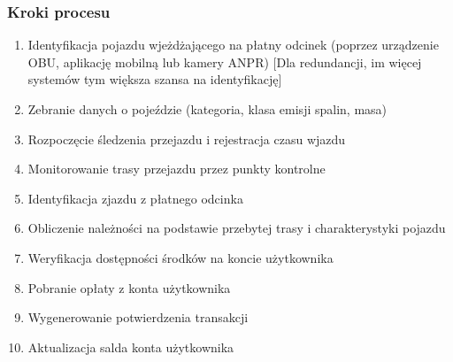 \documentclass[12pt]{article}
\begin{document}
\subsubsection{Kroki procesu}
\begin{enumerate}
    \item Identyfikacja pojazdu wjeżdżającego na płatny odcinek (poprzez urządzenie OBU, aplikację mobilną lub kamery ANPR) [Dla redundancji, im więcej systemów tym większa szansa na identyfikację]
    \item Zebranie danych o pojeździe (kategoria, klasa emisji spalin, masa)
    \item Rozpoczęcie śledzenia przejazdu i rejestracja czasu wjazdu
    \item Monitorowanie trasy przejazdu przez punkty kontrolne
    \item Identyfikacja zjazdu z płatnego odcinka
    \item Obliczenie należności na podstawie przebytej trasy i charakterystyki pojazdu
    \item Weryfikacja dostępności środków na koncie użytkownika
    \item Pobranie opłaty z konta użytkownika
    \item Wygenerowanie potwierdzenia transakcji
    \item Aktualizacja salda konta użytkownika
\end{enumerate}
\end{document}
